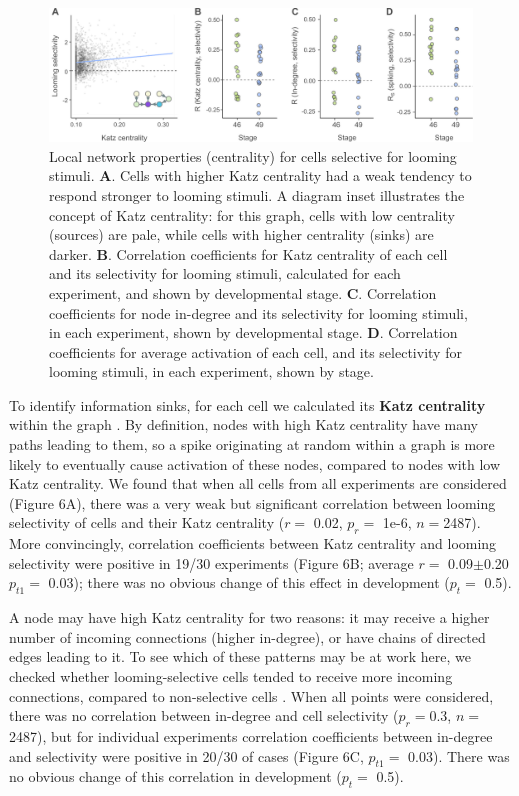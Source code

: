 \documentclass{article}
\begin{document}
\begin{figure}[t!]
\includegraphics[width=\linewidth]{fig6.pdf}
\caption{
Local network properties (centrality) for cells selective for looming stimuli. \textbf{A}. Cells with higher Katz centrality had a weak tendency to respond stronger to looming stimuli. A diagram inset illustrates the concept of Katz centrality: for this graph, cells with low centrality (sources) are pale, while cells with higher centrality (sinks) are darker. \textbf{B}. Correlation coefficients for Katz centrality of each cell and its selectivity for looming stimuli, calculated for each experiment, and shown by developmental stage. \textbf{C}. Correlation coefficients for node in-degree and its selectivity for looming stimuli, in each experiment, shown by developmental stage. \textbf{D}. Correlation coefficients for average activation of each cell, and its selectivity for looming stimuli, in each experiment, shown by stage. }
\end{figure}

To identify information sinks, for each cell we calculated its \textbf{Katz centrality} within the graph \citep{katz1953original, fletcher2018katz}. By definition, nodes with high Katz centrality have many paths leading to them, so a spike originating at random within a graph is more likely to eventually cause activation of these nodes, compared to nodes with low Katz centrality. We found that when all cells from all experiments are considered (Figure 6A), there was a very weak but significant correlation between looming selectivity of cells and their Katz centrality ($r =$ 0.02, $p_{r} =$ 1e-6, $n=$2487). More convincingly, correlation coefficients between Katz centrality and looming selectivity were positive in 19/30 experiments (Figure 6B; average $r=$ 0.09$\pm$0.20 $p_{t1}=$ 0.03); there was no obvious change of this effect in development ($p_t=$ 0.5).

A node may have high Katz centrality for two reasons: it may receive a higher number of incoming connections (higher in-degree), or have chains of directed edges leading to it. To see which of these patterns may be at work here, we checked whether looming-selective cells tended to receive more incoming connections, compared to non-selective cells \citep{litwin2014assemblies}. When all points were considered, there was no correlation between in-degree and cell selectivity ($p_{r}=$0.3, $n=$ 2487), but for individual experiments correlation coefficients between in-degree and selectivity were positive in 20/30 of cases (Figure 6C, $p_{t1}=$ 0.03). There was no obvious change of this correlation in development ($p_t=$ 0.5).
\end{document}
